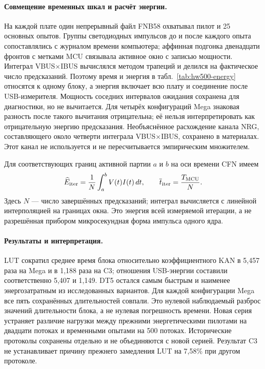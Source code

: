 \paragraph{Совмещение временных шкал и расчёт энергии.}
На каждой плате один непрерывный файл FNB58 охватывал пилот и 25 основных опытов. Группы светодиодных импульсов до и после каждого опыта сопоставлялись с журналом времени компьютера; аффинная подгонка двенадцати фронтов с метками MCU связывала активное окно с записью мощности. Интеграл VBUS$\times$IBUS вычислялся методом трапеций и делился на фактическое число предсказаний. Поэтому время и энергия в табл.~\ref{tab:hw500-energy} относятся к одному блоку, а энергия включает всю плату и соединение после USB-измерителя. Мощность соседних интервалов ожидания сохранена для диагностики, но не вычитается. Для четырёх конфигураций Mega знаковая разность после такого вычитания отрицательна; её нельзя интерпретировать как отрицательную энергию предсказания. Необъяснённое расхождение канала NRG, составляющего около четверти интеграла VBUS$\times$IBUS, сохранено в материалах. Этот канал не используется и не пересчитывается эмпирическим множителем.

Для соответствующих границ активной партии $a$ и $b$ на оси времени CFN имеем
\begin{equation}
\widehat E_{\rm iter}=\frac{1}{N}\int_a^b V(t)I(t)\,dt,
\qquad \overline t_{\rm iter}=\frac{T_{\rm MCU}}{N}.
\label{eq:hw500-energy}
\end{equation}
Здесь $N$ --- число завершённых предсказаний; интеграл вычисляется с линейной интерполяцией на границах окна. Это энергия всей измеряемой итерации, а не разрешённая прибором микросекундная форма импульса одного ядра.



\paragraph{Результаты и интерпретация.}
LUT сократил среднее время блока относительно коэффициентного KAN в 5,457 раза на Mega и в 1,188 раза на C3; отношения USB-энергии составили соответственно 5,407 и 1,149. DT5 остался самым быстрым и наименее энергозатратным из исследованных вариантов. Для каждой конфигурации Mega все пять сохранённых длительностей совпали. Это нулевой наблюдаемый разброс значений длительности блока, а не нулевая погрешность времени. Новая серия устраняет различие нагрузки между прежними энергетическими пилотами на двадцати потоках и временными опытами на 500 потоках. Исторические протоколы сохранены отдельно и не объединяются с новой серией. Результат C3 не устанавливает причину прежнего замедления LUT на 7,58\% при другом протоколе.

